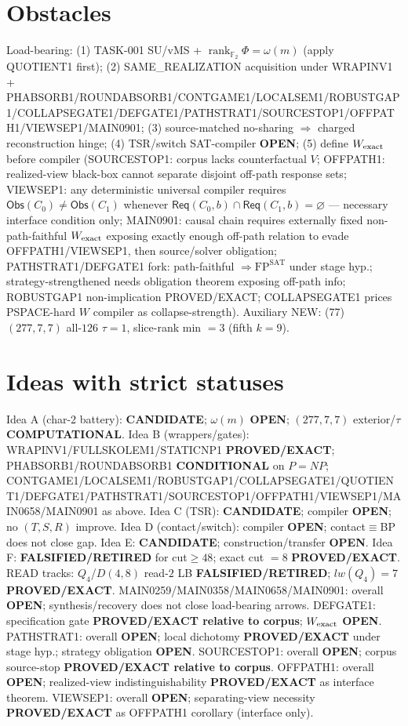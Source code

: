 \documentclass[11pt]{article}
\begin{document}
\section*{Obstacles}
Load-bearing: (1) TASK-001 SU/vMS + $\operatorname{rank}_{\mathbb F_2}\Phi=\omega(m)$ (apply QUOTIENT1 first);
(2) SAME\_REALIZATION acquisition under WRAPINV1 + PHABSORB1/ROUNDABSORB1/CONTGAME1/LOCALSEM1/ROBUSTGAP1/COLLAPSEGATE1/DEFGATE1/PATHSTRAT1/SOURCESTOP1/OFFPATH1/VIEWSEP1/MAIN0901;
(3) source-matched no-sharing $\Rightarrow$ charged reconstruction hinge;
(4) TSR/switch SAT-compiler \textbf{OPEN};
(5) define $W_{\rm exact}$ before compiler (SOURCESTOP1: corpus lacks counterfactual $V$;
OFFPATH1: realized-view black-box cannot separate disjoint off-path response sets;
VIEWSEP1: any deterministic universal compiler requires $\mathsf{Obs}(C_0)\ne\mathsf{Obs}(C_1)$
whenever $\mathsf{Req}(C_0,b)\cap\mathsf{Req}(C_1,b)=\varnothing$ --- necessary interface condition only;
MAIN0901: causal chain requires externally fixed non-path-faithful $W_{\rm exact}$ exposing
exactly enough off-path relation to evade OFFPATH1/VIEWSEP1, then source/solver obligation;
PATHSTRAT1/DEFGATE1 fork: path-faithful $\Rightarrow\mathrm{FP}^{\mathrm{SAT}}$ under stage hyp.;
strategy-strengthened needs obligation theorem exposing off-path info;
ROBUSTGAP1 non-implication PROVED/EXACT; COLLAPSEGATE1 prices PSPACE-hard $W$ compiler as collapse-strength).
Auxiliary NEW: (77) $(277,7,7)$ all-$126$ $\tau{=}1$, slice-rank min $=3$ (fifth $k{=}9$).

\section*{Ideas with strict statuses}
Idea A (char-2 battery): \textbf{CANDIDATE}; $\omega(m)$ \textbf{OPEN}; $(277,7,7)$ exterior/$\tau$ \textbf{COMPUTATIONAL}.
Idea B (wrappers/gates): WRAPINV1/FULLSKOLEM1/STATICNP1 \textbf{PROVED/EXACT};
PHABSORB1/ROUNDABSORB1 \textbf{CONDITIONAL} on $P=NP$;
CONTGAME1/LOCALSEM1/ROBUSTGAP1/COLLAPSEGATE1/QUOTIENT1/DEFGATE1/PATHSTRAT1/SOURCESTOP1/OFFPATH1/VIEWSEP1/MAIN0658/MAIN0901 as above.
Idea C (TSR): \textbf{CANDIDATE}; compiler \textbf{OPEN}; no $(T,S,R)$ improve.
Idea D (contact/switch): compiler \textbf{OPEN}; contact$\equiv$BP does not close gap.
Idea E: \textbf{CANDIDATE}; construction/transfer \textbf{OPEN}.
Idea F: \textbf{FALSIFIED/RETIRED} for cut$\ge48$; exact cut $=8$ \textbf{PROVED/EXACT}.
READ tracks: $Q_4$/$D(4,8)$ read-$2$ LB \textbf{FALSIFIED/RETIRED}; $lw(Q_4)=7$ \textbf{PROVED/EXACT}.
MAIN0259/MAIN0358/MAIN0658/MAIN0901: overall \textbf{OPEN}; synthesis/recovery does not close load-bearing arrows.
DEFGATE1: specification gate \textbf{PROVED/EXACT relative to corpus}; $W_{\rm exact}$ \textbf{OPEN}.
PATHSTRAT1: overall \textbf{OPEN}; local dichotomy \textbf{PROVED/EXACT} under stage hyp.; strategy obligation \textbf{OPEN}.
SOURCESTOP1: overall \textbf{OPEN}; corpus source-stop \textbf{PROVED/EXACT relative to corpus}.
OFFPATH1: overall \textbf{OPEN}; realized-view indistinguishability \textbf{PROVED/EXACT} as interface theorem.
VIEWSEP1: overall \textbf{OPEN}; separating-view necessity \textbf{PROVED/EXACT} as OFFPATH1 corollary (interface only).
\end{document}

